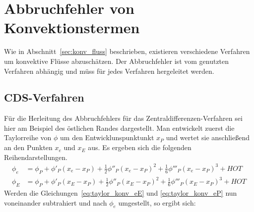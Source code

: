 \section{Abbruchfehler von Konvektionstermen}

Wie in Abschnitt~\ref{sec:konv_fluss} beschrieben, existieren verschiedene Verfahren
um konvektive Flüsse abzuschätzen. Der Abbruchfehler ist vom genutzten Verfahren
abhängig und müss für jedes Verfahren hergeleitet werden.

\subsection{CDS-Verfahren}
\label{sec:te_cds}

Für die Herleitung des Abbruchfehlers für das Zentraldifferenzen-Verfahren sei hier am Beispiel des östlichen Randes dargestellt.
Man entwickelt zuerst die Taylorreihe von $\phi$ um den Entwicklunspunktunkt $x_P$ und wertet sie anschließend
an den Punkten $x_e$ und $x_E$ aus. Es ergeben sich die folgenden Reihendarstellungen.
\begin{align}
  \phi_e &= \phi_P + \phi'_P(x_e-x_P)+\frac{1}{2}\phi''_P(x_e-x_P)^2
  +\frac{1}{6}\phi'''_P(x_e-x_P)^3+HOT
  \label{eq:taylor_konv_eP}\\
  \phi_E &= \phi_P + \phi'_P(x_E-x_P)+\frac{1}{2}\phi''_P(x_E-x_P)^2
  +\frac{1}{6}\phi'''_P(x_E-x_P)^3+HOT
  \label{eq:taylor_konv_eE}
\end{align}
Werden die Gleichungen~\eqref{eq:taylor_konv_eE} und \eqref{eq:taylor_konv_eP} nun
voneinander subtrahiert und nach $\phi_e$ umgestellt, so ergibt sich:

